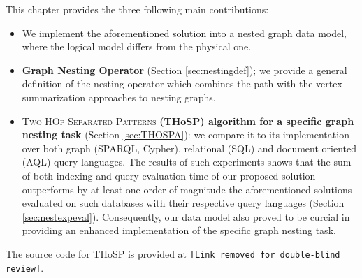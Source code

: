 


This chapter provides the three following main contributions:

\begin{itemize}
	\item We implement the aforementioned solution into a nested graph data model, where the logical model differs from the physical one.
	\item \textbf{Graph Nesting Operator} (Section \ref{sec:nestingdef}); we provide a general definition of the nesting operator which combines the path  with the vertex summarization approaches to nesting graphs.
	\item \textsc{{Two HOp Separated Patterns}} \textbf{(THoSP) algorithm for a specific graph nesting task} (Section \ref{sec:THOSPA}): we
	compare it to its implementation
	over both graph  (SPARQL, Cypher), relational (SQL) and document oriented (AQL) query languages. The results of such experiments shows that the sum of both indexing and query evaluation time of our proposed solution outperforms by at least one order of magnitude the aforementioned solutions evaluated on such databases with their respective query languages (Section \ref{sec:nestexpeval}). Consequently, our data model also proved to be curcial in providing an enhanced implementation of the specific graph nesting task.
\end{itemize}

The source code for THoSP is provided at \texttt{\color{red}[Link removed for double-blind review]}.
